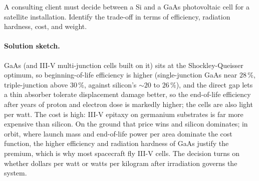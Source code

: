 \begin{exercise}
A consulting client must decide between a Si and a GaAs photovoltaic
cell for a satellite installation. Identify the trade-off in terms of
efficiency, radiation hardness, cost, and weight.
\paragraph{Solution sketch.} GaAs (and III-V multi-junction cells built
on it) sits at the Shockley-Queisser optimum, so beginning-of-life
efficiency is higher (single-junction GaAs near $28\,\%$, triple-junction
above $30\,\%$, against silicon's $\sim 20$ to $26\,\%$), and the direct
gap lets a thin absorber tolerate displacement damage better, so the
end-of-life efficiency after years of proton and electron dose is
markedly higher; the cells are also light per watt. The cost is high:
III-V epitaxy on germanium substrates is far more expensive than
silicon. On the ground that price wins and silicon dominates; in orbit,
where launch mass and end-of-life power per area dominate the cost
function, the higher efficiency and radiation hardness of GaAs justify
the premium, which is why most spacecraft fly III-V cells. The decision
turns on whether dollars per watt or watts per kilogram after
irradiation governs the system.
\end{exercise}
